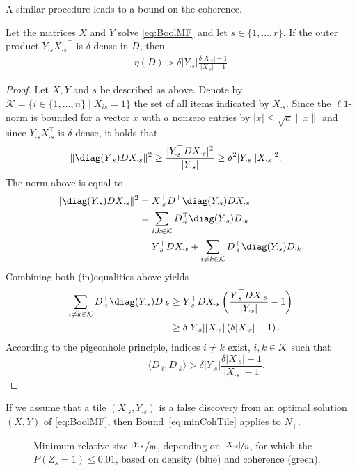%
A similar procedure leads to a bound on the coherence.
\begin{lemma} \label{thm:minCohTile}
Let the matrices $X$ and $Y$ solve \eqref{eq:BoolMF} and let $s\in\{1,\ldots,r\}$. If the outer product $Y_{\cdot s}{X_{\cdot s}}^\top$ is $\delta$-dense in $D$, then
\begin{align}
\eta(D) > \delta|Y_{\cdot s}|\frac{\delta|X_{\cdot s}|-1}{|X_{\cdot s}|-1}\label{eq:minCohTile}
\end{align}
\end{lemma}
%
\begin{proof}
Let $X,Y$ and $s$ be described as above. Denote by $\mathcal{K}=\{i\in\{1,\ldots, n\}\mid X_{is}=1\}$ the set of all items indicated by $X_{\cdot s}$. Since the $\ell1$-norm is bounded for a vector $x$ with $a$ nonzero entries by $|x|\leq\sqrt{a}\|x\|$ and since $Y_{\cdot s}X_{\cdot s}^\top$ is $\delta$-dense, it holds that
\begin{align*}
\|\diag(Y_{\cdot s})DX_{\cdot s}\|^2&\geq \frac{|Y_{\cdot s}^\top DX_{\cdot s}|^2}{|Y_{\cdot s}|}\geq \delta^2|Y_{\cdot s}||X_{\cdot s}|^2.
\end{align*} 
The norm above is equal to
\begin{align*}
\|\diag(Y_{\cdot s})DX_{\cdot s}\|^2& = X_{\cdot s}^\top D^\top\diag(Y_{\cdot s})DX_{\cdot s}\\
&=\sum_{i,k\in\mathcal{K}} D_{\cdot i}^\top \diag(Y_{\cdot s})D_{\cdot k}\\
&= Y_{\cdot s}^\top DX_{\cdot s}+\sum_{i\neq k\in\mathcal{K}}D_{\cdot i}^\top \diag(Y_{\cdot s})D_{\cdot k}.
\end{align*}
Combining both (in)equalities above yields
\begin{align*}
\sum_{i\neq k\in\mathcal{K}}D_{\cdot i}^\top \diag(Y_{\cdot s})D_{\cdot k}& \geq Y_{\cdot s}^\top DX_{\cdot s}\left(\frac{Y_{\cdot s}^\top DX_{\cdot s}}{|Y_{\cdot s}|}-1\right)\\
&\geq \delta|Y_{\cdot s}||X_{\cdot s}|\left(\delta|X_{\cdot s}|-1\right).
\end{align*}
According to the pigeonhole principle, indices $i\neq k$ exist, $i,k\in\mathcal{K}$ such that
\begin{displaymath}
~\qquad\qquad\quad\langle D_{\cdot i}, D_{\cdot k}\rangle
> \delta|Y_{\cdot s}|\frac{\delta|X_{\cdot s}|-1}{|X_{\cdot s}|-1}.
\end{displaymath}
\end{proof}
%
If we assume that a tile $(X_{\cdot s},Y_{\cdot s})$ is a false discovery from an optimal solution $(X,Y)$ of \eqref{eq:BoolMF}, then Bound~\eqref{eq:minCohTile} applies to $N_+$.
\begin{figure}
\centering

\caption{Minimum relative size $\nicefrac{|Y_{\cdot s}|}{m}$, depending on $\nicefrac{|X_{\cdot s}|}{n}$, for which the $P(Z_s=1)\leq 0.01$, based on density (blue) and coherence (green).}
\label{fig:theory}
\end{figure}

